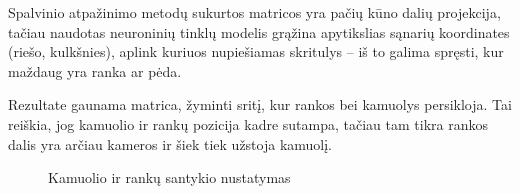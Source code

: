 \documentclass{VUMIFPSbakalaurinis}
\begin{document}
Spalvinio atpažinimo metodų sukurtos matricos yra pačių kūno dalių projekcija, tačiau naudotas neuroninių tinklų modelis grąžina apytikslias sąnarių koordinates (riešo, kulkšnies), aplink kuriuos nupiešiamas skritulys – iš to galima spręsti, kur maždaug yra ranka ar pėda.  

Rezultate gaunama matrica, žyminti sritį, kur rankos bei kamuolys persikloja. Tai reiškia, jog kamuolio ir rankų pozicija kadre sutampa, tačiau tam tikra rankos dalis yra arčiau kameros ir šiek tiek užstoja kamuolį. 

\begin{figure}[H]
	\centering
	\qquad
	\qquad
	\qquad
	\caption{Kamuolio ir rankų santykio nustatymas}
	\label{fig:hand_and_ball}
\end{figure}
\end{document}
